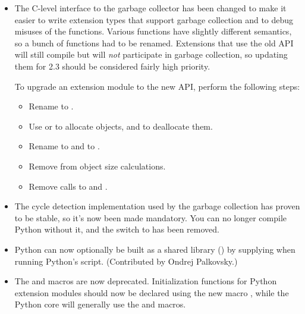 \documentclass{howto}
\begin{document}
\begin{itemize}

\item The C-level interface to the garbage collector has been changed
to make it easier to write extension types that support garbage
collection and to debug misuses of the functions.
Various functions have slightly different semantics, so a bunch of
functions had to be renamed.  Extensions that use the old API will
still compile but will \emph{not} participate in garbage collection,
so updating them for 2.3 should be considered fairly high priority.

To upgrade an extension module to the new API, perform the following
steps:

\begin{itemize}

\item Rename  to .

\item Use  or  to
allocate objects, and  to deallocate them.

\item Rename  to  and
 to .

\item Remove  from object size calculations.

\item Remove calls to  and .

\end{itemize}

\item The cycle detection implementation used by the garbage collection
has proven to be stable, so it's now been made mandatory.  You can no
longer compile Python without it, and the
 switch to  has been removed.

\item Python can now optionally be built as a shared library
() by supplying 
when running Python's  script.  (Contributed by Ondrej
Palkovsky.)

\item The  and  macros
are now deprecated.  Initialization functions for Python extension
modules should now be declared using the new macro
, while the Python core will generally
use the  and 
macros.


\end{itemize}
\end{document}
